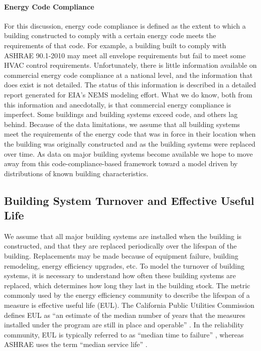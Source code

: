 \paragraph{Energy Code Compliance}
For this discussion, energy code compliance is defined as the extent to which a building constructed to comply with a certain energy code meets the requirements of that code. For example, a building built to comply with ASHRAE 90.1-2010 may meet all envelope requirements but fail to meet some HVAC control requirements. Unfortunately, there is little information available on commercial energy code compliance at a national level, and the information that does exist is not detailed. The status of this information is described in a detailed report \citep{icf_com_code_compliance_status} generated for EIA’s NEMS modeling effort. What we do know, both from this information and anecdotally, is that commercial energy compliance is imperfect. Some buildings and building systems exceed code, and others lag behind. Because of the data limitations, we assume that all building systems meet the requirements of the energy code that was in force in their location when the building was originally constructed and as the building systems were replaced over time. As data on major building systems become available we hope to move away from this code-compliance-based framework toward a model driven by distributions of known building characteristics.

\subsection{Building System Turnover and Effective Useful Life} %
\label{sec:system_turnover_and_eul}

We assume that all major building systems are installed when the building is constructed, and that they are replaced periodically over the lifespan of the building. Replacements may be made because of equipment failure, building remodeling, energy efficiency upgrades, etc. To model the turnover of building systems, it is necessary to understand how often these building systems are replaced, which determines how long they last in the building stock. The metric commonly used by the energy efficiency community to describe the lifespan of a measure is effective useful life (EUL). The California Public Utilities Commission defines EUL as ``an estimate of the median number of years that the measures installed under the program are still in place and operable'' \citep{cpuc_ee_manual}. In the reliability community, EUL is typically referred to as ``median time to failure'' \citep{ti_reliability_website}, whereas ASHRAE uses the term ``median service life'' \citep{ashrae_reliability_db_article}.


